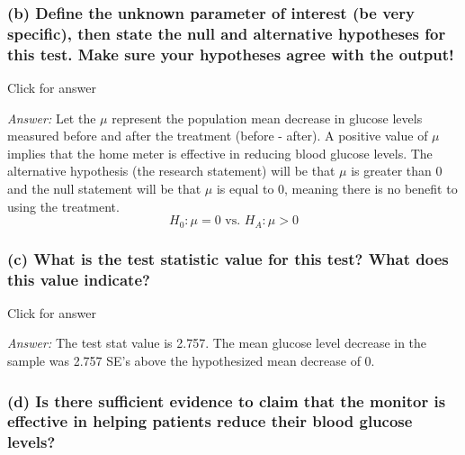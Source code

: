\documentclass[
]{book}
\begin{document}
\hypertarget{b-define-the-unknown-parameter-of-interest-be-very-specific-then-state-the-null-and-alternative-hypotheses-for-this-test.-make-sure-your-hypotheses-agree-with-the-output}{%
\subsubsection{(b) Define the unknown parameter of interest (be very specific), then state the null and alternative hypotheses for this test. Make sure your hypotheses agree with the output!}\label{b-define-the-unknown-parameter-of-interest-be-very-specific-then-state-the-null-and-alternative-hypotheses-for-this-test.-make-sure-your-hypotheses-agree-with-the-output}}

Click for answer

\emph{Answer:} Let the \(\mu\) represent the population mean decrease in glucose levels measured before and after the treatment (before - after). A positive value of \(\mu\) implies that the home meter is effective in reducing blood glucose levels. The alternative hypothesis (the research statement) will be that \(\mu\) is greater than 0 and the null statement will be that \(\mu\) is equal to 0, meaning there is no benefit to using the treatment.
\[
H_0:  \mu = 0 \textrm{ vs. } H_A: \mu > 0
\]

\hypertarget{c-what-is-the-test-statistic-value-for-this-test-what-does-this-value-indicate}{%
\subsubsection{(c) What is the test statistic value for this test? What does this value indicate?}\label{c-what-is-the-test-statistic-value-for-this-test-what-does-this-value-indicate}}

Click for answer

\emph{Answer:} The test stat value is 2.757. The mean glucose level decrease in the sample was 2.757 SE's above the hypothesized mean decrease of 0.

\hypertarget{d-is-there-sufficient-evidence-to-claim-that-the-monitor-is-effective-in-helping-patients-reduce-their-blood-glucose-levels}{%
\subsubsection{(d) Is there sufficient evidence to claim that the monitor is effective in helping patients reduce their blood glucose levels?}\label{d-is-there-sufficient-evidence-to-claim-that-the-monitor-is-effective-in-helping-patients-reduce-their-blood-glucose-levels}}
\end{document}

